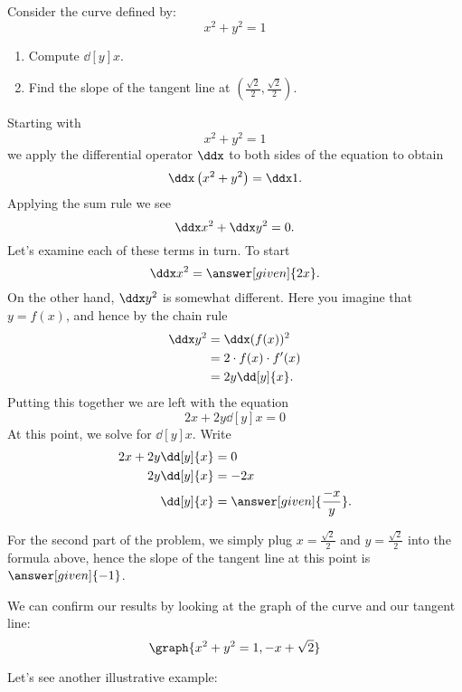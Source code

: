 \documentclass{ximera}
\begin{document}
\begin{example}
Consider the curve defined by:
\[
x^2 + y^2 = 1
\]
\begin{enumerate}
\item Compute $\dd[y]{x}$.
\item Find the slope of the tangent line at $\left(\frac{\sqrt{2}}{2},\frac{\sqrt{2}}{2}\right)$.
\end{enumerate}
\begin{explanation}
  Starting with 
\[
x^2 + y^2 = 1
\]
we apply the differential operator $\ddx$ to both sides of the
equation to obtain
\[
\ddx \left(x^2+y^2\right) = \ddx 1.
\]
Applying the sum rule we see
\[
\ddx x^2+\ddx y^2 = 0.
\]
Let's examine each of these terms in turn. To start
\[
\ddx x^2 = \answer[given]{2x}.
\]
On the other hand, $\ddx y^2$ is somewhat different. Here you imagine that $y = f(x)$, and hence by the chain rule
\begin{align*}
\ddx y^2 &= \ddx (f(x))^2 \\ 
&= 2\cdot f(x) \cdot f'(x) \\
&= 2y\dd[y]{x}.
\end{align*}
Putting this together we are left with the equation
\[
2x + 2y\dd[y]{x} =0
\]
At this point, we solve for $\dd[y]{x}$. Write
\begin{align*}
2x + 2y\dd[y]{x} &= 0\\
2y \dd[y]{x} &= -2x\\
\dd[y]{x} &= \answer[given]{\frac{-x}{y}}.
\end{align*}

For the second part of the problem, we simply plug $x=\frac{\sqrt{2}}{2}$ and $y=\frac{\sqrt{2}}{2}$
into the formula above, hence the slope of the tangent line at this point 
is $\answer[given]{-1}$.
\begin{prompt}
  We can confirm our results by looking at the graph of the curve and
  our tangent line:
  \[
  \graph{x^2+y^2=1,-x+\sqrt{2}}
  \]
\end{prompt}
\end{explanation}
\end{example}

Let's see another illustrative example:
\end{document}
